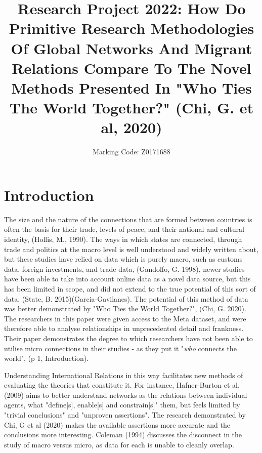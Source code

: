 \documentclass[12pt]{article}
\date{}
\author{Marking Code: Z0171688}
\title{
Research Project 2022: How Do Primitive Research Methodologies Of Global Networks And Migrant Relations 
Compare To The Novel Methods 
Presented In "Who Ties The World Together?" (Chi, G. et al, 2020)
}
\begin{document}
\parindent=20pt

\maketitle

\section{Introduction}

The size and the nature of the connections that are formed between countries is often the 
basis for their trade, levels of peace, and their national and cultural identity, (Hollis, M., 1990). 
The ways in which states are connected, through trade and politics at the macro level is 
well understood and widely written about, but these studies have relied 
on data which is purely macro, such as customs data, foreign investments, and trade 
data, (Gandolfo, G. 1998), newer studies have been able to take into account online data 
as a novel data source, but this has been limited in scope, and did not extend to the
true potential of this sort of data, (State, B. 2015)(Garcia-Gavilanes).
The potential of this method of data was better demonstrated by "Who Ties the World Together?", (Chi, G. 2020).
The researchers in this paper were given access to the Meta dataset, and were therefore able to 
analyse relationships in unprecedented detail and frankness. Their paper demonstrates the degree
to which researchers have not been able to utilise micro connections in their studies - as they 
put it "\textit{who} connects the world", (p 1, Introduction). 

Understanding International Relations in this way facilitates new methods of evaluating the 
theories that constitute it. For instance, Hafner-Burton et al. (2009) aims to better 
understand networks as the relations between individual agents, what "define[s], enable[s] and 
constrain[s]" them, but feels limited by "trivial conclusions" and "unproven assertions". 
The research demonstrated by Chi, G et al (2020) makes the available assertions more accurate
and the conclusions more interesting. Coleman (1994) discusses the disconnect in the study  
of macro versus micro, as data for each is unable to cleanly overlap.
\end{document}
